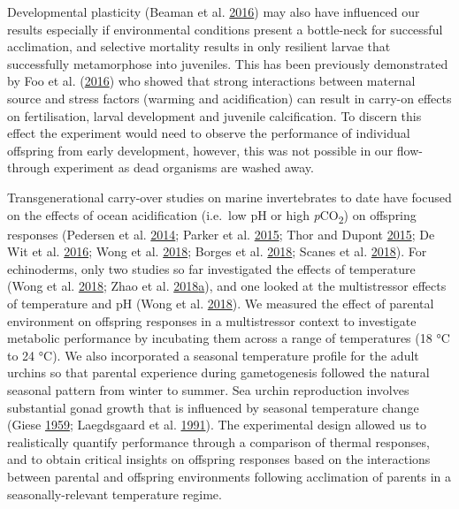\documentclass[a4paper,10pt, oneside]{memoir}
\begin{document}
Developmental plasticity (Beaman et al. \protect\hyperlink{ref-Beaman2016}{2016}) may also have influenced our results especially if environmental conditions present a bottle-neck for successful acclimation, and selective mortality results in only resilient larvae that successfully metamorphose into juveniles.
This has been previously demonstrated by Foo et al. (\protect\hyperlink{ref-Foo2016}{2016}) who showed that strong interactions between maternal source and stress factors (warming and acidification) can result in carry-on effects on fertilisation, larval development and juvenile calcification.
To discern this effect the experiment would need to observe the performance of individual offspring from early development, however, this was not possible in our flow-through experiment as dead organisms are washed away.

Transgenerational carry-over studies on marine invertebrates to date have focused on the effects of ocean acidification (i.e.~low pH or high \emph{p}CO\textsubscript{2}) on offspring responses (Pedersen et al. \protect\hyperlink{ref-Pedersen2014}{2014}; Parker et al. \protect\hyperlink{ref-Parker2015}{2015}; Thor and Dupont \protect\hyperlink{ref-Thor2015}{2015}; De Wit et al. \protect\hyperlink{ref-DeWit2016}{2016}; Wong et al. \protect\hyperlink{ref-Wong2018}{2018}; Borges et al. \protect\hyperlink{ref-Borges2018}{2018}; Scanes et al. \protect\hyperlink{ref-Scanes2018}{2018}).
For echinoderms, only two studies so far investigated the effects of temperature (Wong et al. \protect\hyperlink{ref-Wong2018}{2018}; Zhao et al. \protect\hyperlink{ref-Zhao2018}{2018}\protect\hyperlink{ref-Zhao2018}{a}), and one looked at the multistressor effects of temperature and pH (Wong et al. \protect\hyperlink{ref-Wong2018}{2018}).
We measured the effect of parental environment on offspring responses in a multistressor context to investigate metabolic performance by incubating them across a range of temperatures (18 °C to 24 °C).
We also incorporated a seasonal temperature profile for the adult urchins so that parental experience during gametogenesis followed the natural seasonal pattern from winter to summer.
Sea urchin reproduction involves substantial gonad growth that is influenced by seasonal temperature change (Giese \protect\hyperlink{ref-Giese1959}{1959}; Laegdsgaard et al. \protect\hyperlink{ref-Laegdsgaard1991}{1991}).
The experimental design allowed us to realistically quantify performance through a comparison of thermal responses, and to obtain critical insights on offspring responses based on the interactions between parental and offspring environments following acclimation of parents in a seasonally-relevant temperature regime.
\end{document}
